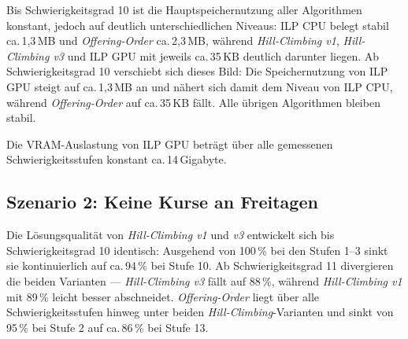 \vspace{1cm}

\newpage

Bis Schwierigkeitsgrad 10 ist die Hauptspeichernutzung aller Algorithmen konstant, jedoch auf
deutlich unterschiedlichen Niveaus: ILP CPU belegt stabil ca.\,1{,}3\,MB und
\textit{Offering-Order} ca.\,2{,}3\,MB, während \textit{Hill-Climbing v1},
\textit{Hill-Climbing v3} und ILP GPU mit jeweils ca.\,35\,KB deutlich darunter liegen. Ab
Schwierigkeitsgrad 10 verschiebt sich dieses Bild: Die Speichernutzung von ILP GPU steigt auf
ca.\,1{,}3\,MB an und nähert sich damit dem Niveau von ILP CPU, während
\textit{Offering-Order} auf ca.\,35\,KB fällt. Alle übrigen Algorithmen bleiben stabil.

\vspace{1cm}

\newpage

Die VRAM-Auslastung von ILP GPU beträgt über alle gemessenen Schwierigkeitsstufen konstant
ca.\,14\,Gigabyte.

\vspace{1cm}

\newpage


\subsection{Szenario 2: Keine Kurse an Freitagen}

Die Lösungsqualität von \textit{Hill-Climbing v1} und \textit{v3} entwickelt sich bis
Schwierigkeitsgrad 10 identisch: Ausgehend von 100\,\% bei den Stufen 1--3 sinkt sie
kontinuierlich auf ca.\,94\,\% bei Stufe 10. Ab Schwierigkeitsgrad 11 divergieren die beiden
Varianten --- \textit{Hill-Climbing v3} fällt auf 88\,\%, während \textit{Hill-Climbing v1}
mit 89\,\% leicht besser abschneidet. \textit{Offering-Order} liegt über alle
Schwierigkeitsstufen hinweg unter beiden \textit{Hill-Climbing}-Varianten und sinkt von
95\,\% bei Stufe 2 auf ca.\,86\,\% bei Stufe 13.

\vspace{1cm}

\newpage

